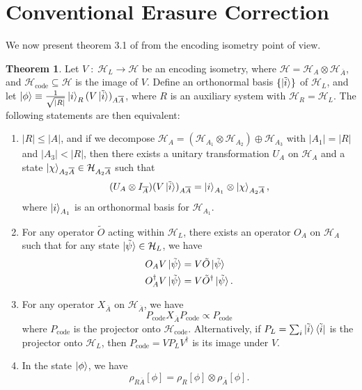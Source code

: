 \documentclass[12pt,a4paper]{report}
\numberwithin{equation}{section}
\newcommand{\ketbra}[2]{\ket{#1}\bra{#2}}
\newcommand{\ketbras}[1]{\ketbra{#1}{#1}}
\newcommand{\Pc}{P_{\text{code}}}
\newcommand{\Hcode}{\mathcal{H}_{\text{code}}}
\newcommand{\ol}[1]{\overline{#1}}
\theoremstyle{definition}
\theoremstyle{theorem}
\newtheorem{theorem}{Theorem}[section]
\theoremstyle{theorem}
\theoremstyle{example}
\theoremstyle{definition}
\begin{document}
\section{Conventional Erasure Correction}
We now present theorem 3.1 of \cite{Harlow} from the encoding isometry point of view.
\begin{theorem}\label{t1}
	Let $V\;:\;\mathcal{H}_{L}\to\mathcal{H}$ be an encoding isometry, where $\mathcal{H}=\mathcal{H}_{A}\otimes\mathcal{H}_{\ol{A}}$, and $\Hcode\subseteq\mathcal{H}$ is the image of $V$. Define an orthonormal basis $\{\ket{\tilde{i}}\}$ of $\mathcal{H}_{L}$, and let $\ket{\phi}\equiv\frac{1}{\sqrt{|R|}}\ket{i}_{R}(V\ket{\tilde{i}})_{A\ol{A}}$, where $R$ is an auxiliary system with $\mathcal{H}_{R}=\mathcal{H}_{L}$. The following statements are then equivalent:
	\begin{enumerate}
		\item $|R|\leq|A|$, and if we decompose $\mathcal{H}_{A}=(\mathcal{H}_{A_{1}}\otimes\mathcal{H}_{A_{2}})\oplus\mathcal{H}_{A_{3}}$ with $|A_{1}|=|R|$ and $|A_{3}|<|R|$, then there exists a unitary transformation $U_{A}$ on $\mathcal{H}_{A}$ and a state $\ket{\chi}_{A_{2}\ol{A}}\in\mathcal{H}_{A_{2}\ol{A}}$ such that 
		\begin{equation}\label{C1}
			(U_{A}\otimes I_{\ol{A}})(V\ket{\tilde{i}})_{A\ol{A}}=\ket{i}_{A_{1}}\otimes\ket{\chi}_{A_{2}\ol{A}},
		\end{equation}
		where $\ket{i}_{A_{1}}$ is an orthonormal basis for $\mathcal{H}_{A_{1}}$.
		\item For any operator $\tilde{O}$ acting within $\mathcal{H}_{L}$, there exists an operator $O_{A}$ on $\mathcal{H}_{A}$ such that for any state $\ket{\tilde{\psi}}\in\mathcal{H}_{L}$, we have
		\begin{equation}\label{C2}
			\begin{aligned}
				O_{A}V\ket{\tilde{\psi}}&=V\tilde{O}\ket{\tilde{\psi}}\\
				O_{A}^{\dagger}V\ket{\tilde{\psi}}&=V\tilde{O}^{\dagger}\ket{\tilde{\psi}}.
			\end{aligned}
		\end{equation}
		\item For any operator $X_{\ol{A}}$ on $\mathcal{H}_{\ol{A}}$, we have
		\begin{equation}\label{C3}
			\Pc X_{\ol{A}}\Pc\propto\Pc
		\end{equation}
		where $\Pc$ is the projector onto $\Hcode$. Alternatively, if $P_{L}=\sum_{i}\ketbras{\tilde{i}}$ is the projector onto $\mathcal{H}_{L}$, then $\Pc=VP_{L}V^{\dagger}$ is its image under $V$.
		\item In the state $\ket{\phi}$, we have
		\begin{equation}\label{C4}
			\rho_{R\ol{A}}[\phi]=\rho_{R}[\phi]\otimes\rho_{\ol{A}}[\phi].
		\end{equation}
	\end{enumerate}
\end{theorem}
\end{document}
